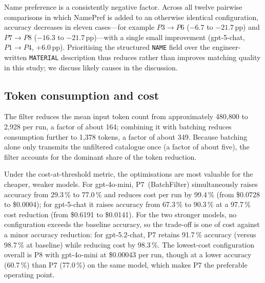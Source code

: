 \documentclass[10pt, a4paper, twocolumn]{article}
\begin{document}
Name preference is a consistently negative factor. Across all twelve pairwise
comparisons in which NamePref is added to an otherwise identical configuration, accuracy
decreases in eleven cases---for example $P3\rightarrow P6$ ($-6.7$ to $-21.7$\,pp) and
$P7\rightarrow P8$ ($-16.3$ to $-21.7$\,pp)---with a single small improvement
(gpt-5-chat, $P1\rightarrow P4$, $+6.0$\,pp). Prioritising the structured \texttt{NAME}
field over the engineer-written \texttt{MATERIAL} description thus reduces rather than
improves matching quality in this study; we discuss likely causes in
the discussion. 

\subsection{Token consumption and cost}

The filter reduces the mean input token count from approximately 480{,}800 to 2{,}928
per run, a factor of about 164; combining it with batching reduces consumption further
to 1{,}378 tokens, a factor of about 349. Because batching alone only transmits the
unfiltered catalogue once (a factor of about five), the filter accounts for the dominant
share of the token reduction.

Under the cost-at-threshold metric, the optimisations are most valuable for the cheaper,
weaker models. For gpt-4o-mini, P7~(BatchFilter) simultaneously raises accuracy from
29.3\,\% to 77.0\,\% and reduces cost per run by 99.4\,\% (from \$0.0728 to \$0.0004);
for gpt-5-chat it raises accuracy from 67.3\,\% to 90.3\,\% at a 97.7\,\% cost reduction
(from \$0.6191 to \$0.0141). For the two stronger models, no configuration exceeds the
baseline accuracy, so the trade-off is one of cost against a minor accuracy reduction:
for gpt-5.2-chat, P7 retains 91.7\,\% accuracy (versus 98.7\,\% at baseline) while
reducing cost by 98.3\,\%. The lowest-cost configuration overall is P8 with gpt-4o-mini
at \$0.00043 per run, though at a lower accuracy (60.7\,\%) than P7 (77.0\,\%) on the
same model, which makes P7 the preferable operating point.
\end{document}
